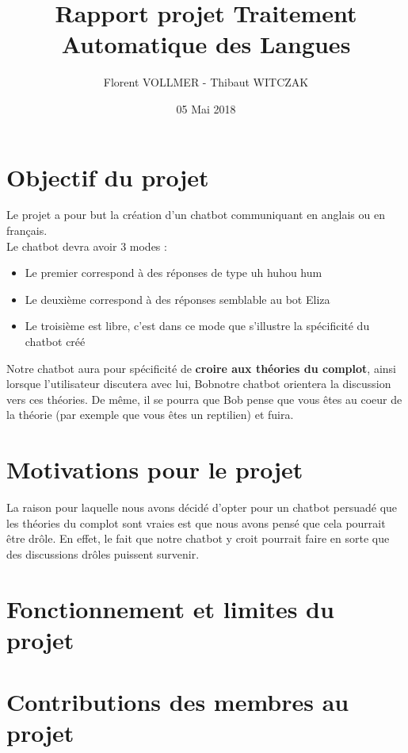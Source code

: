 \documentclass[paper=a4, fontsize=11pt]{article}
\begin{document}
\title{Rapport projet Traitement Automatique des Langues}
\author{Florent VOLLMER - Thibaut WITCZAK}
\date{05 Mai 2018}
\maketitle

\section{Objectif du projet}
Le projet a pour but la création d'un chatbot communiquant en anglais ou en français. \\

Le chatbot devra avoir 3 modes :
\begin{itemize}
\item Le premier correspond à des réponses de type \og uh huh\fg ou \og hum\fg
\item Le deuxième correspond à des réponses semblable au bot Eliza
\item Le troisième est \og libre\fg, c'est dans ce mode que s'illustre la spécificité du chatbot créé
\end{itemize}

\vspace{0.5cm}

Notre chatbot aura pour spécificité de \textbf{croire aux théories du complot}, ainsi lorsque l'utilisateur discutera avec lui, \og Bob\fg notre chatbot orientera la discussion vers ces théories.
De même, il se pourra que Bob pense que vous êtes au coeur de la théorie (par exemple que vous êtes un reptilien) et fuira.

\section{Motivations pour le projet}
La raison pour laquelle nous avons décidé d'opter pour un chatbot persuadé que les théories du complot sont vraies est que nous avons pensé que cela pourrait être drôle. En effet, le fait que notre chatbot y croit pourrait faire en sorte que des discussions drôles puissent survenir. 

\section{Fonctionnement et limites du projet}


\section{Contributions des membres au projet}
\end{document}
